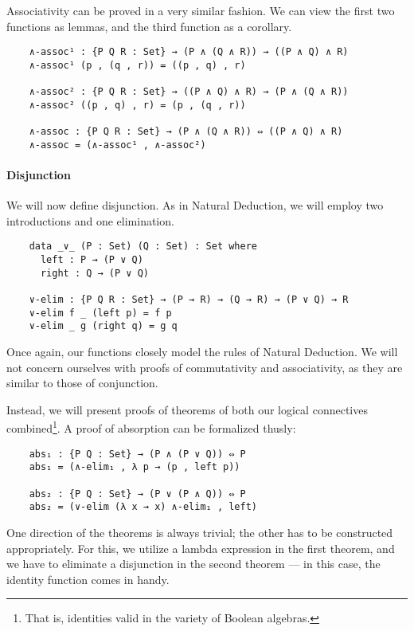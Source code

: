 \documentclass[12pt]{article}
\begin{document}
Associativity can be proved in a very similar fashion. We can view the first two functions as lemmas, and the third function as a corollary.
\begin{verbatim}
    ∧-assoc¹ : {P Q R : Set} → (P ∧ (Q ∧ R)) → ((P ∧ Q) ∧ R)
    ∧-assoc¹ (p , (q , r)) = ((p , q) , r)

    ∧-assoc² : {P Q R : Set} → ((P ∧ Q) ∧ R) → (P ∧ (Q ∧ R))
    ∧-assoc² ((p , q) , r) = (p , (q , r))

    ∧-assoc : {P Q R : Set} → (P ∧ (Q ∧ R)) ⇔ ((P ∧ Q) ∧ R)
    ∧-assoc = (∧-assoc¹ , ∧-assoc²)
\end{verbatim}

\paragraph{Disjunction}
We will now define disjunction. As in Natural Deduction, we will employ two introductions and one elimination.
\begin{verbatim}
    data _∨_ (P : Set) (Q : Set) : Set where
      left : P → (P ∨ Q)
      right : Q → (P ∨ Q)

    ∨-elim : {P Q R : Set} → (P → R) → (Q → R) → (P ∨ Q) → R
    ∨-elim f _ (left p) = f p
    ∨-elim _ g (right q) = g q
\end{verbatim}
Once again, our functions closely model the rules of Natural Deduction. We will not concern ourselves with proofs of commutativity and associativity, as they are similar to those of conjunction.

Instead, we will present proofs of theorems of both our logical connectives combined\footnote{That is, identities valid in the variety of Boolean algebras.}. A proof of absorption can be formalized thusly:
\begin{verbatim}
    abs₁ : {P Q : Set} → (P ∧ (P ∨ Q)) ⇔ P
    abs₁ = (∧-elim₁ , λ p → (p , left p))

    abs₂ : {P Q : Set} → (P ∨ (P ∧ Q)) ⇔ P
    abs₂ = (∨-elim (λ x → x) ∧-elim₁ , left)
\end{verbatim}
One direction of the theorems is always trivial; the other has to be constructed appropriately. For this, we utilize a lambda expression in the first theorem, and we have to eliminate a disjunction in the second theorem — in this case, the identity function comes in handy.
\end{document}
